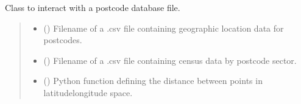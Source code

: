 \documentclass[letterpaper,10pt,english]{sphinxmanual}
\begin{document}
\begin{fulllineitems}
\label{\detokenize{index:locator.PostcodeLocator}}
\pysigstartsignatures
{}
\pysigstopsignatures
\sphinxAtStartPar
Class to interact with a postcode database file.
\begin{quote}\begin{description}
\begin{itemize}
\item {} 
\sphinxAtStartPar
{} (\sphinxstyleliteralemphasis{\sphinxupquote{, }}) \textendash{} Filename of a .csv file containing geographic
location data for postcodes.

\item {} 
\sphinxAtStartPar
{} (\sphinxstyleliteralemphasis{\sphinxupquote{, }}) \textendash{} Filename of a .csv file containing census data by postcode sector.

\item {} 
\sphinxAtStartPar
{} () \textendash{} Python function defining the distance between points in
latitude\sphinxhyphen{}longitude space.

\end{itemize}

\end{description}\end{quote}


\end{fulllineitems}
\end{document}
